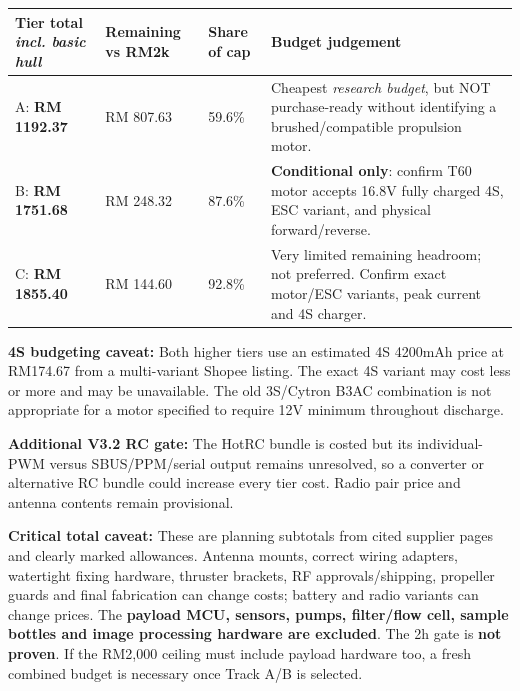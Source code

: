\begin{tabularx}{\linewidth}{L{35mm}L{25mm}L{25mm}Y}
\toprule \textbf{Tier total \emph{incl. basic hull}} & \textbf{Remaining vs RM2k} & \textbf{Share of cap} & \textbf{Budget judgement}\\\midrule
A: \textbf{RM 1192.37} & RM 807.63 & 59.6\% & Cheapest \emph{research budget}, but NOT purchase-ready without identifying a brushed/compatible propulsion motor.\\
B: \textbf{RM 1751.68} & RM 248.32 & 87.6\% & \textbf{Conditional only}: confirm T60 motor accepts 16.8V fully charged 4S, ESC variant, and physical forward/reverse.\\
C: \textbf{RM 1855.40} & RM 144.60 & 92.8\% & Very limited remaining headroom; not preferred. Confirm exact motor/ESC variants, peak current and 4S charger.\\
\bottomrule
\end{tabularx}

\textbf{4S budgeting caveat:} Both higher tiers use an estimated 4S 4200mAh price at RM174.67 from a multi-variant Shopee listing. The exact 4S variant may cost less or more and may be unavailable. The old 3S/Cytron B3AC combination is not appropriate for a motor specified to require 12V minimum throughout discharge. \cite{bat4Shopee,charger4,bat52,charger}

\textbf{Additional V3.2 RC gate:} The HotRC bundle is costed but its individual-PWM versus SBUS/PPM/serial output remains unresolved, so a converter or alternative RC bundle could increase every tier cost. Radio pair price and antenna contents remain provisional.\par\medskip\textbf{Critical total caveat:} These are planning subtotals from cited supplier pages and clearly marked allowances. Antenna mounts, correct wiring adapters, watertight fixing hardware, thruster brackets, RF approvals/shipping, propeller guards and final fabrication can change costs; battery and radio variants can change prices. The \textbf{payload MCU, sensors, pumps, filter/flow cell, sample bottles and image processing hardware are excluded}. The 2h gate is \textbf{not proven}. If the RM2,000 ceiling must include payload hardware too, a fresh combined budget is necessary once Track A/B is selected.

